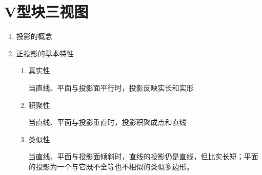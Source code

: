 \section{V型块三视图}
\begin{enumerate}
\item 投影的概念
\item 正投影的基本特性
\begin{enumerate}
\item 真实性

当直线、平面与投影面平行时，投影反映实长和实形
\item 积聚性

当直线、平面与投影垂直时，投影积聚成点和直线
\item 类似性

当直线、平面与投影面倾斜时，直线的投影仍是直线，但比实长短；平面的投影为一个与它既不全等也不相似的类似多边形。
\end{enumerate}
\end{enumerate}

\endinput